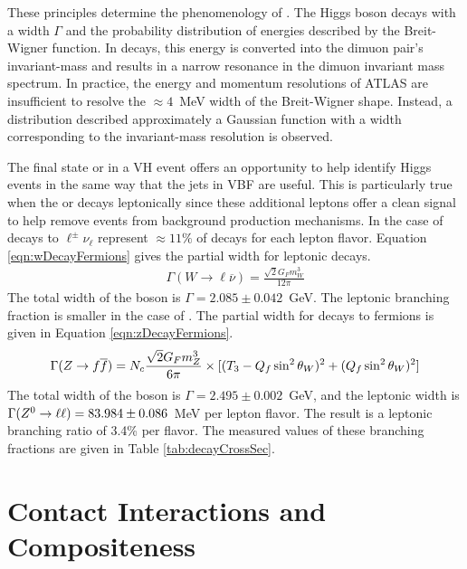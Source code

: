 These principles determine the phenomenology of \hmm.
The Higgs boson decays with a width $\Gamma$ and the probability distribution of energies described by the Breit-Wigner function.
In \hmm decays, this energy is converted into the dimuon pair's invariant-mass and results in a narrow resonance in the dimuon invariant mass spectrum.
In practice, the energy and momentum resolutions of ATLAS are insufficient to resolve the $\approx4$~MeV width of the Breit-Wigner shape.
Instead, a distribution described approximately a Gaussian function with a width corresponding to the invariant-mass resolution is observed.

The final state \W or \Z in a VH event offers an opportunity to help identify Higgs events in the same way that the jets in VBF are useful.
This is particularly true when the \W or \Z decays leptonically since these additional leptons offer a clean signal to help remove events from background production mechanisms.
In the case of \W decays to $\ell^\pm\nu_\ell$ represent $\approx11\%$ of decays for each lepton flavor.
Equation \ref{eqn:wDecayFermions} gives the partial width for leptonic \W decays.
\begin{equation}\begin{split}\label{eqn:wDecayFermions}
    \Gamma(W\to\ell\overline{\nu})=\frac{\sqrt{2}G_Fm_W^3}{12\pi}
\end{split}\end{equation} 
The total width of the \W boson is $\Gamma=2.085\pm0.042$~GeV.
The leptonic branching fraction is smaller in the case of \Z.
The partial width for \Z decays to fermions is given in Equation \ref{eqn:zDecayFermions}.
\begin{equation}\begin{split}\label{eqn:zDecayFermions}
    \Gamma(Z\to f\overline{f})=N_c\frac{\sqrt{2}G_Fm_Z^3}{6\pi}\times[(T_3-Q_f\sin^2\theta_W)^2+(Q_f\sin^2\theta_W)^2]
\end{split}\end{equation} 
The total width of the \Z boson is $\Gamma=2.495\pm0.002$~GeV, and the leptonic width is $\Gamma(Z^0\to\ell\ell)=83.984\pm0.086$~MeV per lepton flavor.
The result is a leptonic branching ratio of 3.4\% per flavor. \cite{pdg2018}
The measured values of these branching fractions are given in Table \ref{tab:decayCrossSec}.

\section{Contact Interactions and Compositeness}


